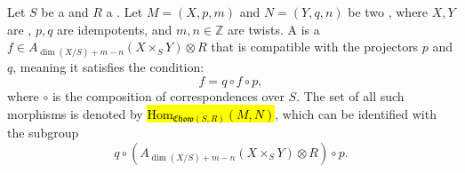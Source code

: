 \begin{definition} \label{definition:morphism_of_relative_chow_motives_over_a_noetherian_base_and_coefficients_in_a_commutative_ring}
Let $S$ be a  and $R$ a . Let $M = (X, p, m)$ and $N = (Y, q, n)$ be two , where $X, Y$ are  , $p, q$ are idempotents, and $m, n \in \mathbb{Z}$ are twists. A  is a  $f \in A_{\dim(X/S) + m - n}(X \times_S Y) \otimes R$ that is compatible with the projectors $p$ and $q$, meaning it satisfies the condition:
\[ f = q \circ f \circ p, \]
where $\circ$ is the composition of correspondences over $S$. 
The set of all such morphisms is denoted by \hl{$\mathrm{Hom}_{\mathfrak{Chow}(S, R)}(M, N)$}, which can be identified with the subgroup 
$$q \circ \left( A_{\dim(X/S) + m - n}(X \times_S Y) \otimes R \right) \circ p.$$
\end{definition}